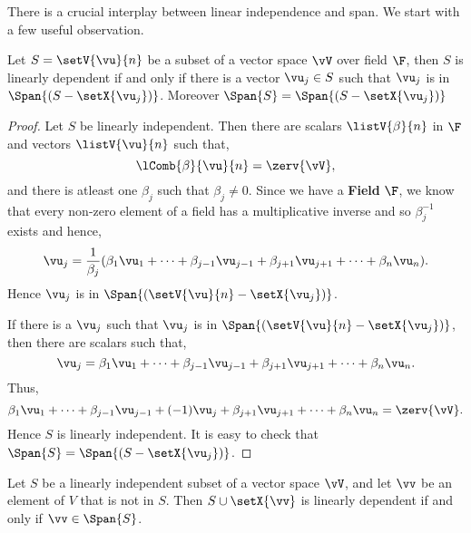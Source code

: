 There is a crucial interplay between linear independence and span. We start with a few useful
observation.
\begin{Proposition}\label{prop:span_linear_ind_0}
    Let $S = \setV{\vu}{n}$ be a subset of a vector space $\vV$ over field $\F$, then 
    $S$ is linearly dependent if and only if there is a vector $\vu_{j} \in S$ such that
    $\vu_j$ is in $\Span{(S- \setX{\vu_{j}})}$. Moreover $\Span{S} = \Span{(S- \setX{\vu_{j}})}$
\end{Proposition}
\begin{proof}
    Let $S$ be linearly independent. Then there are scalars $\listV{\beta}{n}$ in $\F$ and vectors
    $\listV{\vu}{n}$ such that,
    \[\lComb{\beta}{\vu}{n} = \zerv{\vV},\]
    and there is atleast one $\beta_j$ such that $\beta_j \neq 0$.
    Since we have a \textbf{Field} $\F$, we know that
    every non-zero element of a field has a multiplicative inverse and so $\beta_j^{-1}$ exists 
    and hence, 
    \[\vu_j = \frac{1}{\beta_{j}}(\beta_1\vu_{1} + \cdots + \beta_{j-1}\vu_{j-1} + \beta_{j+1}\vu_{j+1} +
	\cdots + \beta_{n}\vu_{n}).\]
    Hence $\vu_{j}$ is in  $\Span{(\setV{\vu}{n} - \setX{\vu_{j}})}$.

    If there is a $\vu_{j}$ such that $\vu_j$ is in $\Span{(\setV{\vu}{n} - \setX{\vu_{j}})}$, then there are
    scalars such that,
    \[\vu_j = \beta_1\vu_{1} + \cdots + \beta_{j-1}\vu_{j-1} + \beta_{j+1}\vu_{j+1} +
	\cdots + \beta_{n}\vu_{n}.\]
    Thus, 
    \[\beta_1\vu_{1} + \cdots + \beta_{j-1}\vu_{j-1} + (-1)\vu_j + \beta_{j+1}\vu_{j+1} +
	\cdots + \beta_{n}\vu_{n} = \zerv{\vV}.\] 
    Hence $S$ is linearly independent. It is easy to check that $\Span{S} = \Span{(S- \setX{\vu_{j}})}$.
\end{proof}
\begin{Proposition}\label{prop:span_linear_ind_I}
    Let $S$ be a linearly independent subset of a vector space $\vV$, and let $\vv$ be an element of $V$ that
    is not in $S$. Then $S\cup\setX{\vv}$ is linearly dependent if and only if $\vv\in\Span{S}$.
\end{Proposition}
